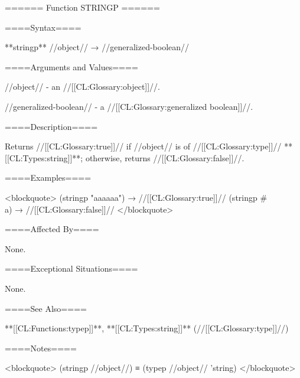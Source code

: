 ====== Function STRINGP ======

====Syntax====

**stringp** //object// → //generalized-boolean//

====Arguments and Values====

//object// - an //[[CL:Glossary:object]]//.

//generalized-boolean// - a //[[CL:Glossary:generalized boolean]]//.

====Description====

Returns //[[CL:Glossary:true]]// if //object// is of //[[CL:Glossary:type]]// **[[CL:Types:string]]**; otherwise, returns //[[CL:Glossary:false]]//.

====Examples====

<blockquote> (stringp "aaaaaa") → //[[CL:Glossary:true]]// (stringp #\\a) → //[[CL:Glossary:false]]// </blockquote>

====Affected By====

None.

====Exceptional Situations====

None.

====See Also====

**[[CL:Functions:typep]]**, **[[CL:Types:string]]** (//[[CL:Glossary:type]]//)

====Notes====

<blockquote> (stringp //object//) ≡ (typep //object// 'string) </blockquote>


